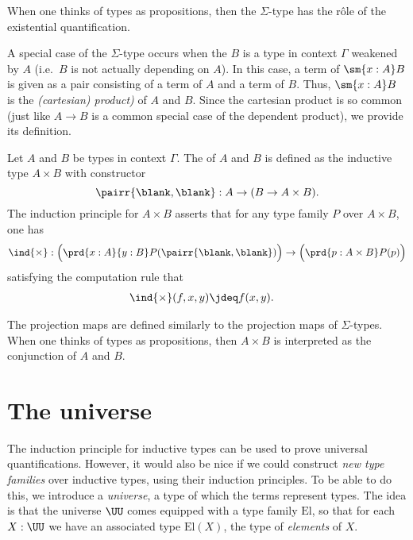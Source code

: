 When one thinks of types as propositions, then the $\Sigma$-type has the r\^{o}le of the existential quantification.

A special case of the $\Sigma$-type occurs when the $B$ is a type in context $\Gamma$ weakened by $A$ (i.e.~$B$ is not actually depending on $A$). In this case, a term of $\sm{x:A}B$ is given as a pair consisting of a term of $A$ and a term of $B$. Thus, $\sm{x:A}B$ is the \emph{(cartesian) product)} of $A$ and $B$. Since the cartesian product is so common (just like $A\to B$ is a common special case of the dependent product), we provide its definition.

\begin{defn}
Let $A$ and $B$ be types in context $\Gamma$. The  of $A$ and $B$ is defined as the inductive type $A\times B$ with constructor
\begin{equation*}
\pairr{\blank,\blank}:A\to (B\to A\times B).
\end{equation*}
The induction principle for $A\times B$ asserts that for any type family $P$ over $A\times B$, one has
\begin{equation*}
\ind{\times} : \Big(\prd{x:A}{y:B}P(\pairr{\blank,\blank})\Big)\to\Big(\prd{p:A\times B} P(p)\Big)
\end{equation*}
satisfying the computation rule that
\begin{align*}
\ind{\times}(f,x,y) & \jdeq f(x,y).
\end{align*}
\end{defn}

The projection maps are defined similarly to the projection maps of $\Sigma$-types. When one thinks of types as propositions, then $A\times B$ is interpreted as the conjunction of $A$ and $B$. 

\section{The universe}
The induction principle for inductive types can be used to prove universal quantifications. 
However, it would also be nice if we could construct \emph{new type families} over inductive types, using their induction principles.
To be able to do this, we introduce a \emph{universe}, a type of which the terms represent types. The idea is that the universe $\UU$ comes equipped with a type family $\mathrm{El}$, so that for each $X:\UU$ we have an associated type $\mathrm{El}(X)$, the type of \emph{elements} of $X$. 

